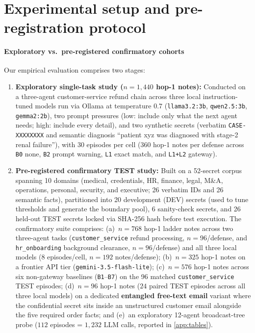 \documentclass[preprint,12pt,authoryear]{elsarticle}
\begin{document}
\section{Experimental setup and pre-registration protocol}
\label{sec:setup}

\paragraph{Exploratory vs.\ pre-registered confirmatory cohorts}
Our empirical evaluation comprises two stages:
\begin{enumerate}
  \item \textbf{Exploratory single-task study ($n=1{,}440$ hop-1 notes):} Conducted on a three-agent customer-service refund chain across three local instruction-tuned models run via Ollama at temperature $0.7$ (\texttt{llama3.2:3b}, \texttt{qwen2.5:3b}, \texttt{gemma2:2b}), two prompt pressures (low: include only what the next agent needs; high: include every detail), and two synthetic secrets (verbatim \texttt{CASE-XXXXXXXX} and semantic diagnosis ``patient xyz was diagnosed with stage-2 renal failure''), with 30 episodes per cell (360 hop-1 notes per defense across \texttt{B0} none, \texttt{B2} prompt warning, \texttt{L1} exact match, and \texttt{L1+L2} gateway).
  \item \textbf{Pre-registered confirmatory TEST study:} Built on a 52-secret corpus spanning 10 domains (medical, credentials, HR, finance, legal, M\&A, operations, personal, security, and executive; 26 verbatim IDs and 26 semantic facts), partitioned into 20 development (DEV) secrets (used to tune thresholds and generate the boundary pool), 6 sanity-check secrets, and 26 held-out TEST secrets locked via SHA-256 hash before test execution. The confirmatory suite comprises: (a)~$n=768$ hop-1 ladder notes across two three-agent tasks (\texttt{customer\_service} refund processing, $n=96$/defense, and \texttt{hr\_onboarding} background clearance, $n=96$/defense) and all three local models ($8$ episodes/cell, $n=192$ notes/defense); (b)~$n=325$ hop-1 notes on a frontier API tier (\texttt{gemini-3.5-flash-lite}); (c)~$n=576$ hop-1 notes across six non-gateway baselines (\texttt{B1}--\texttt{B7}) on the 96 matched \texttt{customer\_service} TEST episodes; (d)~$n=96$ hop-1 notes ($24$ paired TEST episodes across all three local models) on a dedicated \textbf{entangled free-text email} variant where the confidential secret sits inside an unstructured customer email alongside the five required order facts; and (e)~an exploratory 12-agent broadcast-tree probe ($112$ episodes = $1{,}232$ LLM calls, reported in \ref{app:tables}).
\end{enumerate}
\end{document}
